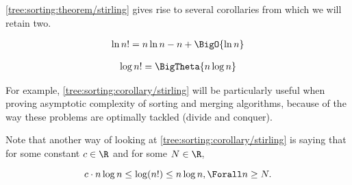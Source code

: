 \ref{tree:sorting:theorem/stirling} gives rise to several corollaries from
which we will retain two.

\begin{corollary}
\begin{align*}
\ln n! &= n \ln n - n + \BigO{\ln n}\\
\end{align*}
\end{corollary}

\begin{corollary}
\label{tree:sorting:corollary/stirling}
\begin{align*}
\log n! &= \BigTheta{n \log n}\\
\end{align*}
\end{corollary}


For example, \ref{tree:sorting:corollary/stirling} will be particularly useful
when proving asymptotic complexity of sorting and merging algorithms, because
of the way these problems are optimally tackled (divide and conquer).

Note that another way of looking at \ref{tree:sorting:corollary/stirling} is
saying that for some constant $c \in \R$ and for some $N \in \R$,

\begin{displaymath}
c \cdot n \log n \leq \log(n!) \leq n \log n, \Forall n \geq N.
\end{displaymath}

